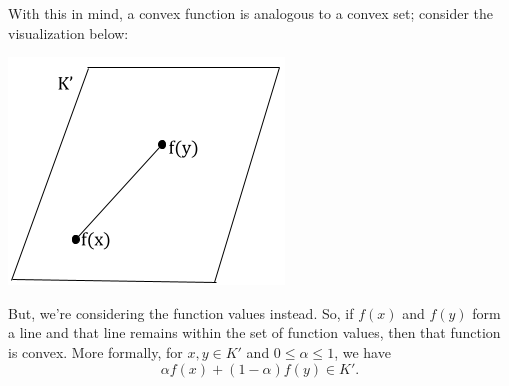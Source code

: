 \documentclass[letterpaper]{article}
\begin{document}
With this in mind, a convex function is analogous to a convex set; consider the visualization below:
\begin{center}
    \includegraphics[scale=0.5]{../assets/convex_funcset.png}
\end{center}
But, we're considering the function values instead. So, if $f(x)$ and $f(y)$ form a line and that line remains within the set of function values, then that function is convex. More formally, for $x, y \in K'$ and $0 \leq \alpha \leq 1$, we have \[\alpha f(x) + (1 - \alpha) f(y) \in K'.\]
\end{document}
